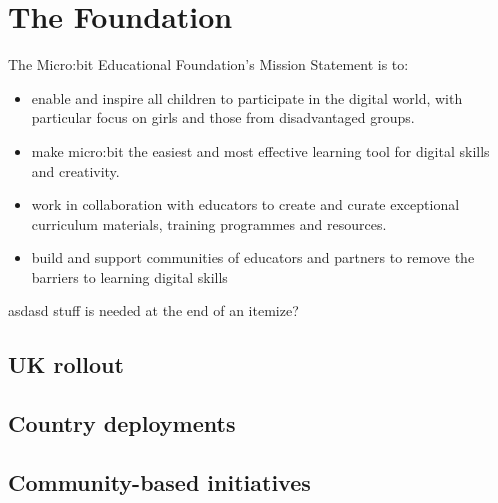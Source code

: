 \section{The Foundation}
\label{sec:mef}

The Micro:bit Educational Foundation's Mission Statement is to:
\begin{itemize}
\item  enable and inspire all children to participate in the digital world,
with particular focus on girls and those from disadvantaged groups.
\item make micro:bit the easiest and most effective learning tool for digital skills and creativity.
\item work in collaboration with educators to create and curate exceptional
curriculum materials, training programmes and resources.
\item build and support communities of educators and partners
to remove the barriers to learning digital skills
\end{itemize}

asdasd stuff is needed at the end of an itemize?


\subsection{UK rollout}


\subsection{Country deployments}


\subsection{Community-based initiatives}



